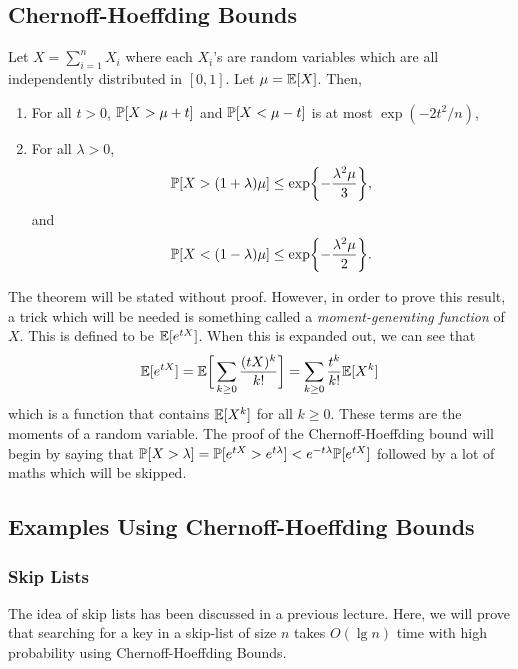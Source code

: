\documentclass[12pt]{article}
\begin{document}
\subsection{Chernoff-Hoeffding Bounds}
\begin{theorem} Let $X = \sum_{i=1}^{n} X_i$ where each $X_i$'s are random variables which are all independently distributed in $[0, 1]$. Let $\mu = \mathbb{E}[X]$. Then,
	\begin{enumerate}
		\item For all $t > 0$, $\mathbb{P}[X > \mu + t]$ and $\mathbb{P}[X < \mu - t]$ is at most $\exp(-2t^2 / n)$,
		\item For all $\lambda > 0$, $$ \mathbb{P}[X > (1+\lambda)\mu] \leq \exp \biggl\{- \frac{\lambda^2 \mu}{3} \biggr\}, $$ and $$ \mathbb{P}[X < (1-\lambda)\mu] \leq \exp \biggl\{- \frac{\lambda^2 \mu}{2} \biggr\}. $$ 
	\end{enumerate}
\end{theorem}
The theorem will be stated without proof. However, in order to prove this result, a trick which will be needed is something called a \textit{moment-generating function} of $X$. This is defined to be $\mathbb{E}[e^{tX}]$. When this is expanded out, we can see that
$$\mathbb{E}[e^{tX}] = \mathbb{E} \bigg[ \sum_{k \geq 0} \frac{(tX)^k}{k!}\bigg] = \sum_{k \geq 0} \frac{t^k}{k!} \mathbb{E}[X^k]$$
which is a function that contains $\mathbb{E}[X^k]$ for all $k \geq 0$. These terms are the moments of a random variable. The proof of the Chernoff-Hoeffding bound will begin by saying that $\mathbb{P}[X > \lambda] = \mathbb{P}[e^{tX} > e^{t\lambda}] < e^{-t\lambda} \mathbb{P}[e^{tX}]$ followed by a lot of maths which will be skipped. 

\subsection{Examples Using Chernoff-Hoeffding Bounds}

\subsubsection{Skip Lists}

The idea of skip lists has been discussed in a previous lecture. Here, we will prove that searching for a key in a skip-list of size $n$ takes $O(\lg n)$ time with high probability using Chernoff-Hoeffding Bounds. 
\end{document}
